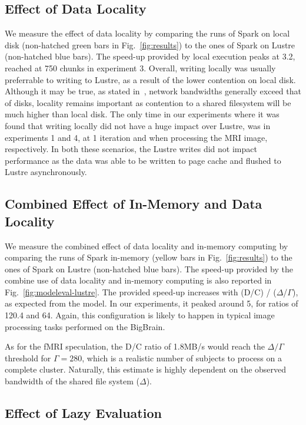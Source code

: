 \documentclass{IEEEtran}
\begin{document}
\subsection{Effect of Data Locality}

We measure the effect of data locality by comparing the runs of Spark
on local disk (non-hatched green bars in Fig.~\ref{fig:results}) to the 
ones of Spark on Lustre (non-hatched blue bars). The speed-up provided by 
local execution peaks at 3.2, reached at 750 chunks in experiment 3. Overall, 
writing locally was usually preferrable to writing to Lustre, as a result of the
lower contention on local disk. Although it may be true, as stated in~\cite{Anantharayanan2011datalocality},
network bandwidths generally exceed that of disks, locality remains important 
as contention to a shared filesystem will be much higher than local disk.
The only time in our experiments where it was found that writing locally did not
have a huge impact over Lustre, was in experiments 1 and 4, at 1 iteration and 
when processing the MRI image, respectively. In both these scenarios, the Lustre 
writes did not impact performance as the data was able to be written to page cache
and flushed to Lustre asynchronously.

\subsection{Combined Effect of In-Memory and Data Locality}
We measure the combined effect of data locality and in-memory computing 
by comparing the runs of Spark in-memory (yellow bars in 
Fig.~\ref{fig:results}) to the ones of Spark on Lustre (non-hatched 
blue bars). The speed-up provided by the combine use of data locality 
and in-memory computing is also reported in 
Fig.~\ref{fig:modeleval-lustre}. The provided speed-up increases with 
(D/C) / ($\Delta$/$\Gamma$), as expected from the model. In our 
experiments, it peaked around 5, for ratios of 120.4 and 64. Again, 
this configuration is likely to happen in typical image processing 
tasks performed on the BigBrain.

As for the fMRI speculation, the D/C 
ratio of 1.8MB/s would reach the $\Delta/\Gamma$ threshold for 
$\Gamma=280$, which is a realistic number of subjects to process on a 
complete cluster. Naturally, this estimate is highly dependent on the observed bandwidth
of the shared file system ($\Delta$).

\subsection{Effect of Lazy Evaluation}
\end{document}
